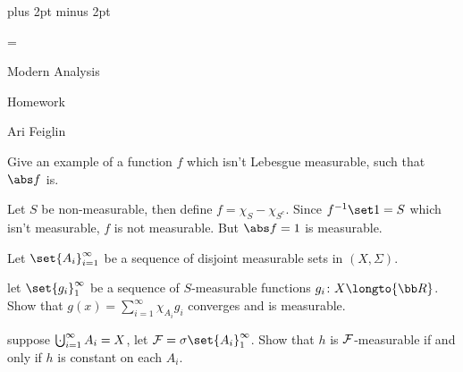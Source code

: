 

\parindent=0pt
\parskip=3pt plus 2pt minus 2pt



\footline={}

\setcounter{section}{4}


\def\printmcount{\the\counter{section}.\the\counter{math counter}}

{

    \centerline{Modern Analysis}
    \smallskip
    \centerline{Homework \the{}}
    \centerline{Ari Feiglin}

\eppbox}

\bexerc

    Give an example of a function $f$ which isn't Lebesgue measurable, such that $\abs f$ is.

\eexerc

Let $S$ be non-measurable, then define $f=\chi_S-\chi_{S^c}$.
Since $f^{-1}\set1=S$ which isn't measurable, $f$ is not measurable.
But $\abs f=1$ is measurable.

\bexerc

    Let $\set{A_i}_{i=1}^\infty$ be a sequence of disjoint measurable sets in $(X,\Sigma)$.
    \benum
        \item let $\set{g_i}_1^\infty$ be a sequence of $S$-measurable functions $g_i\colon X\longto{\bb R}$.
        Show that $g(x)=\sum_{i=1}^\infty\chi_{A_i}g_i$ converges and is measurable.
        \item suppose $\bigdcup_{i=1}^\infty A_i=X$, let ${\cal F}=\sigma\set{A_i}_1^\infty$.
        Show that $h$ is ${\cal F}$-measurable if and only if $h$ is constant on each $A_i$.
    \eenum

\eexerc

